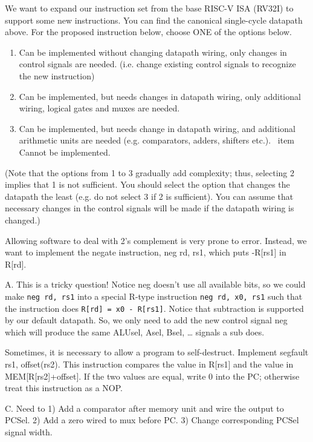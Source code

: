 \begin{blocksection}
\question
We want to expand our instruction set from the base RISC-­V ISA (RV32I) to support some new instructions. You can find the canonical single-cycle datapath above. For the proposed instruction below, choose ONE of the options below.

\begin{enumerate}
    \item Can be implemented without changing datapath wiring, only changes in control signals are needed. (i.e. change existing control signals to recognize the new instruction)
    \item Can be implemented, but needs changes in datapath wiring, only additional wiring, logical gates and muxes are needed.
    \item Can be implemented, but needs change in datapath wiring, and additional arithmetic units are needed (e.g. comparators, adders, shifters etc.).
    \ item Cannot be implemented.
\end{enumerate}

(Note that the options from 1 to 3 gradually add complexity; thus, selecting 2 implies that 1 is not sufficient. You should select the option that changes the datapath the least (e.g. do not select 3 if 2 is sufficient). You can assume that necessary changes in the control signals will be made if the datapath wiring is changed.)

\begin{parts}

\item Allowing software to deal with 2’s complement is very prone to error. Instead, we want to implement the negate instruction, neg rd, rs1, which puts -R[rs1] in R[rd].

\begin{solution}[0.5in]
A. This is a tricky question! Notice neg doesn’t use all available bits, so we could make \texttt{neg rd, rs1} into a special R-type instruction \texttt{neg rd, x0, rs1} such that the instruction does \texttt{R[rd] = x0 - R[rs1]}. Notice that subtraction is supported by our default datapath. So, we only need to add the new control signal neg which will produce the same ALUsel, Asel, Bsel, … signals a sub does.
\end{solution}

\item Sometimes, it is necessary to allow a program to self­-destruct. Implement segfault rs1, offset(rs2). This instruction compares the value in R[rs1] and the value in MEM[R[rs2]+offset]. If the two values are equal, write 0 into the PC; otherwise treat this instruction as a NOP.

\begin{solution}[0.5in]
 C. Need to 1) Add a comparator after memory unit and wire the output to PCSel. 2) Add a zero wired to mux before PC. 3) Change corresponding PCSel signal width.
\end{solution}
\end{parts}

\end{blocksection}